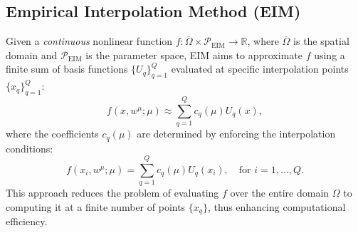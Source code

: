 \documentclass[11pt]{article}
\begin{document}
            \subsection{Empirical Interpolation Method (EIM)}
            Given a \textit{continuous} nonlinear function $f: \overline{\Omega} \times \mathcal{P}_{\text{EIM}} \rightarrow \mathbb{R}$, where $\overline{\Omega}$ is the spatial domain and $\mathcal{P}_{\text{EIM}}$ is the parameter space, EIM aims to approximate $f$ using a finite sum of basis functions $\{ U_q \}_{q=1}^Q$ evaluated at specific interpolation points $\{ x_q \}_{q=1}^Q$:
            \[
            f(x, w^\mu;\mu) \approx \sum_{q=1}^Q c_q(\mu) U_q(x),
            \]
            where the coefficients $c_q(\mu)$ are determined by enforcing the interpolation conditions:
            \[
            f(x_i, w^\mu;  \mu) = \sum_{q=1}^Q c_q(\mu) U_q(x_i), \quad \text{for } i = 1, \ldots, Q.
            \]
            This approach reduces the problem of evaluating \( f \) over the entire domain \( \Omega \) to computing it at a finite number of points \( \{ x_q \} \), thus enhancing computational efficiency.
\end{document}
